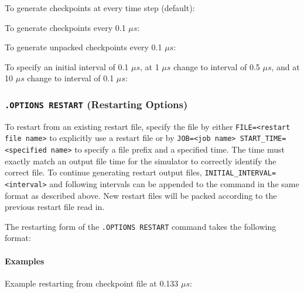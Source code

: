 To generate checkpoints at every time step (default):


To generate checkpoints every 0.1 $\mu s$:


To generate unpacked checkpoints every 0.1 $\mu s$:


To specify an initial interval of 0.1 $\mu s$, at 1 $\mu s$ change to interval
of 0.5 $\mu s$, and at 10 $\mu s$ change to interval of 0.1 $\mu s$:


\subsubsection{\texttt{.OPTIONS RESTART} (Restarting Options)}

To restart from an existing restart file, specify the file
by either \texttt{FILE=<restart file name>} to explicitly use a restart file or
by \texttt{JOB=<job name> START\_TIME=<specified name>} to specify a file
prefix and a specified time.  The time must exactly match an output file time
for the simulator to correctly identify the correct file.  To continue
generating restart output files, \texttt{INITIAL\_INTERVAL=<interval>} and
following intervals can be appended to the command in the same format as
described above.  New restart files will be packed according to the previous
restart file read in.  

The restarting form of the \texttt{.OPTIONS RESTART} command takes the following format:


\paragraph{Examples}

Example restarting from checkpoint file at 0.133 $\mu s$:

